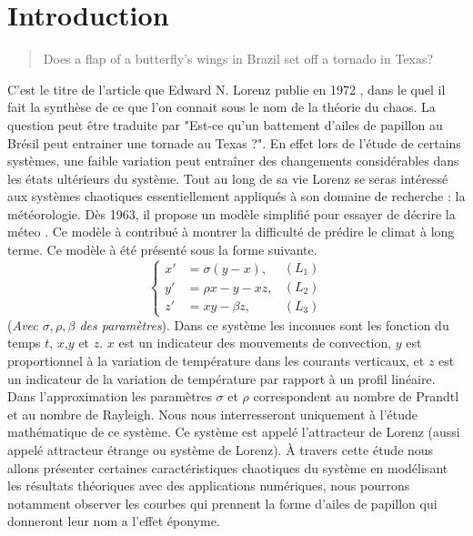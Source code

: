 \documentclass{article}
\newtheorem[M , nocut]{prop}{Proposition}[section]
\newtheorem[M , nocut]{definition}{Définition}
\newtheorem[M , nocut]{lemme}{Lemme}
\newtheorem[L , nocut]{thm}{Théoreme}
\newtheorem[M , nocut]{cor}{Corollaire}
\begin{document}
\section{Introduction}
\thispagestyle{empty}
\setcounter{page}{1}
\begin{quotation}
    Does a flap of a butterfly's wings in Brazil set off a tornado in Texas?
\end{quotation}
C'est le titre de l'article que Edward N. Lorenz publie en 1972 \cite{edward_lorenz_does_1972}, dans le quel il fait la synthèse de ce que l'on connait sous le nom de la théorie du chaos. La question peut être traduite par "Est-ce qu'un battement d'ailes de papillon au Brésil peut entrainer une tornade au Texas ?". En effet lors de l'étude de certains systèmes, une faible variation peut entraîner des changements considérables dans les états ultérieurs du système. Tout au long de sa vie Lorenz se seras intéressé aux systèmes chaotiques essentiellement appliqués à son domaine de recherche : la météorologie. Dès 1963, il propose un modèle simplifié pour essayer de décrire la méteo \cite{edward_n_lorenz_deterministic_1963}. Ce modèle à contribué à montrer la difficulté de prédire le climat à long terme. Ce modèle à été présenté sous la forme suivante.
\begin{equation}
    \label{Lorenz}
    \left\{
    \begin{array}{rl}
        x' &=\sigma(y-x), \\
        y' &=\rho x -y - xz,\\
        z' &=xy - \beta z,
    \end{array}
    \right.
    \begin{array}{r}
        (L_1)\\
        (L_2)\\
        (L_3)
    \end{array}
\end{equation}
(\textit{Avec $\sigma,\rho,\beta$ des paramètres}). Dans ce système les inconues sont les fonction du temps $t$, $x$,$y$ et $z$. $x$ est un indicateur des mouvements de convection, $y$ est proportionnel à la variation de température dans les courants verticaux, et $z$ est un indicateur de la variation de température par rapport à un profil linéaire. Dans l'approximation les paramètres $\sigma$ et $\rho$ correspondent au nombre de Prandtl et au nombre de Rayleigh. Nous nous interresseront uniquement à l'étude mathématique de ce système. Ce système est appelé l'attracteur de Lorenz (aussi appelé attracteur étrange ou système de Lorenz). \`A travers cette étude nous allons présenter certaines caractéristiques chaotiques du système en modélisant les résultats théoriques avec des applications numériques, nous pourrons notamment observer les courbes qui prennent la forme d'ailes de papillon qui donneront leur nom a l'effet éponyme.
   
\end{document}
